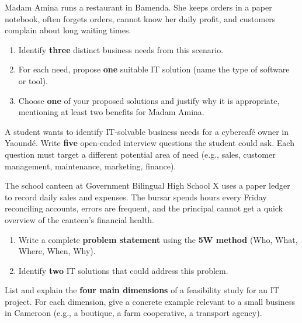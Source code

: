 \documentclass[11pt]{article}
\newcounter{popsec}
\newcounter{popsub}
\newcommand{\courssub}[1]{%
  \stepcounter{popsub}%
  \par\vspace{9pt}\noindent{\popxbold\fontsize{11.5}{13}\selectfont\color{popink}{\color{poporange}\thepopsec.\thepopsub}\hspace{6pt}#1}\par\nopagebreak\vspace{4pt}
}
\begin{document}
\courssub{I practise}

\begin{exercice}
Madam Amina runs a restaurant in Bamenda. She keeps orders in a paper notebook, often forgets orders, cannot know her daily profit, and customers complain about long waiting times.
\begin{enumerate}
\item Identify \textbf{three} distinct business needs from this scenario.
\item For each need, propose \textbf{one} suitable IT solution (name the type of software or tool).
\item Choose \textbf{one} of your proposed solutions and justify why it is appropriate, mentioning at least two benefits for Madam Amina.
\end{enumerate}
\end{exercice}

\begin{exercice}
A student wants to identify IT-solvable business needs for a cybercafé owner in Yaoundé. Write \textbf{five} open-ended interview questions the student could ask. Each question must target a different potential area of need (e.g., sales, customer management, maintenance, marketing, finance).
\end{exercice}

\begin{exercice}
The school canteen at Government Bilingual High School X uses a paper ledger to record daily sales and expenses. The bursar spends hours every Friday reconciling accounts, errors are frequent, and the principal cannot get a quick overview of the canteen's financial health.
\begin{enumerate}
\item Write a complete \textbf{problem statement} using the \textbf{5W method} (Who, What, Where, When, Why).
\item Identify \textbf{two} IT solutions that could address this problem.
\end{enumerate}
\end{exercice}

\begin{exercice}
List and explain the \textbf{four main dimensions} of a feasibility study for an IT project. For each dimension, give a concrete example relevant to a small business in Cameroon (e.g., a boutique, a farm cooperative, a transport agency).
\end{exercice}
\end{document}
